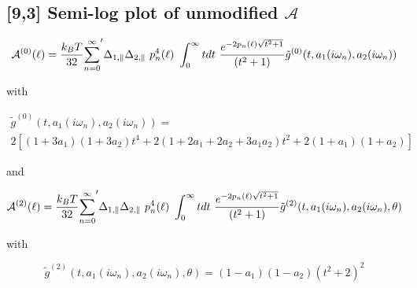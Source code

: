 \documentclass[a4paper]{article}
\begin{document}
\begin{center}
\subsection{[9,3] Semi-log plot of unmodified $\mathcal{A}$ }
\begin{equation}
{\cal A}^{(0)}(\ell) = \frac{k_BT}{32}  {\sum_{n=0}^{\infty}}' \Delta_{1,\parallel} \Delta_{2,\parallel} ~p_n^{4}(\ell) ~\int_0^{\infty} t dt ~\frac{e^{- 2 p_n(\ell) \sqrt{t^{2} + 1}}}{(t^{2} + 1)} \tilde g^{(0)}(t, a_1(i \omega_n), a_2(i \omega_n))
\end{equation}

with

\begin{multline*}
\tilde g^{(0)}(t, a_1(i \omega_n), a_2(i \omega_n)) = \\ 
2 \left[ (1+3a_1)(1+3a_2) t^{4} + 2 (1+2a_1+2a_2+3a_1a_2) t^{2}  + 2(1+a_1)(1+a_2)\right]
\end{multline*}


and

\begin{equation}
{\cal A}^{(2)}(\ell) = \frac{k_BT}{32}  {\sum_{n=0}^{\infty}}' \Delta_{1,\parallel} \Delta_{2,\parallel} ~p_n^{4}(\ell) ~\int_0^{\infty} t dt ~\frac{e^{- 2 p_n(\ell) \sqrt{t^{2} + 1}}}{(t^{2} + 1)} \tilde g^{(2)}(t, a_1(i \omega_n), a_2(i \omega_n), \theta)
\end{equation}

with

\begin{equation}
\tilde g^{(2)}(t, a_1(i \omega_n), a_2(i \omega_n), \theta) = (1-a_1)(1-a_2)(t^{2} + 2)^2
\label{befgqw}
\end{equation}


\end{center}
\end{document}

